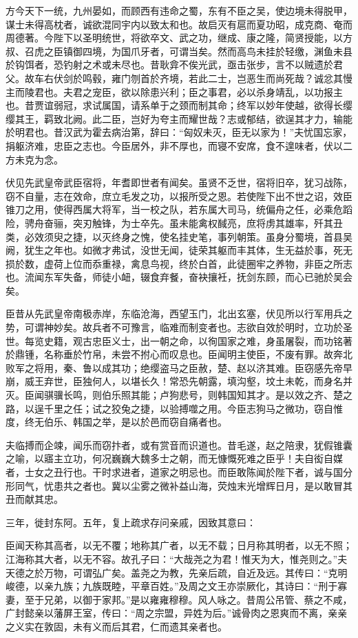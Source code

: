\documentclass[12pt,UTF8]{ctexbook}
\begin{document}
方今天下一统，九州晏如，而顾西有违命之蜀，东有不臣之吴，使边境未得脱甲，谋士未得高枕者，诚欲混同宇内以致太和也。故启灭有扈而夏功昭，成克商、奄而周德著。今陛下以圣明统世，将欲卒文、武之功，继成、康之隆，简贤授能，以方叔、召虎之臣镇御四境，为国爪牙者，可谓当矣。然而高鸟未挂於轻缴，渊鱼未县於钩饵者，恐钓射之术或未尽也。昔耿弇不俟光武，亟击张步，言不以贼遗於君父。故车右伏剑於鸣毂，雍门刎首於齐境，若此二士，岂恶生而尚死哉？诚忿其慢主而陵君也。夫君之宠臣，欲以除患兴利；臣之事君，必以杀身靖乱，以功报主也。昔贾谊弱冠，求试属国，请系单于之颈而制其命；终军以妙年使越，欲得长缨缨其王，羁致北阙。此二臣，岂好为夸主而耀世哉？志或郁结，欲逞其才力，输能於明君也。昔汉武为霍去病治第，辞曰：“匈奴未灭，臣无以家为！”夫忧国忘家，捐躯济难，忠臣之志也。今臣居外，非不厚也，而寝不安席，食不遑味者，伏以二方未克为念。

伏见先武皇帝武臣宿将，年耆即世者有闻矣。虽贤不乏世，宿将旧卒，犹习战陈，窃不自量，志在效命，庶立毛发之功，以报所受之恩。若使陛下出不世之诏，效臣锥刀之用，使得西属大将军，当一校之队，若东属大司马，统偏舟之任，必乘危蹈险，骋舟奋骊，突刃触锋，为士卒先。虽未能禽权馘亮，庶将虏其雄率，歼其丑类，必效须臾之捷，以灭终身之愧，使名挂史笔，事列朝策。虽身分蜀境，首县吴阙，犹生之年也。如微才弗试，没世无闻，徒荣其躯而丰其体，生无益於事，死无损於数，虚荷上位而忝重禄，禽息鸟视，终於白首，此徒圈牢之养物，非臣之所志也。流闻东军失备，师徒小衄，辍食弃餐，奋袂攘衽，抚剑东顾，而心已驰於吴会矣。

臣昔从先武皇帝南极赤岸，东临沧海，西望玉门，北出玄塞，伏见所以行军用兵之势，可谓神妙矣。故兵者不可豫言，临难而制变者也。志欲自效於明时，立功於圣世。每览史籍，观古忠臣义士，出一朝之命，以徇国家之难，身虽屠裂，而功铭著於鼎锺，名称垂於竹帛，未尝不拊心而叹息也。臣闻明主使臣，不废有罪。故奔北败军之将用，秦、鲁以成其功；绝缨盗马之臣赦，楚、赵以济其难。臣窃感先帝早崩，威王弃世，臣独何人，以堪长久！常恐先朝露，填沟壑，坟土未乾，而身名并灭。臣闻骐骥长鸣，则伯乐照其能；卢狗悲号，则韩国知其才。是以效之齐、楚之路，以逞千里之任；试之狡兔之捷，以验搏噬之用。今臣志狗马之微功，窃自惟度，终无伯乐、韩国之举，是以於邑而窃自痛者也。

夫临搏而企竦，闻乐而窃抃者，或有赏音而识道也。昔毛遂，赵之陪隶，犹假锥囊之喻，以寤主立功，何况巍巍大魏多士之朝，而无慷慨死难之臣乎！夫自衒自媒者，士女之丑行也。干时求进者，道家之明忌也。而臣敢陈闻於陛下者，诚与国分形同气，忧患共之者也。冀以尘雾之微补益山海，荧烛末光增辉日月，是以敢冒其丑而献其忠。

三年，徙封东阿。五年，复上疏求存问亲戚，因致其意曰：

臣闻天称其高者，以无不覆；地称其广者，以无不载；日月称其明者，以无不照；江海称其大者，以无不容。故孔子曰：“大哉尧之为君！惟天为大，惟尧则之。”夫天德之於万物，可谓弘广矣。盖尧之为教，先亲后疏，自近及远。其传曰：“克明峻德，以亲九族；九族既睦，平章百姓。”及周之文王亦崇厥化，其诗曰：“刑于寡妻，至于兄弟，以御于家邦。”是以雍雍穆穆。风人咏之。昔周公吊管、蔡之不咸，广封懿亲以藩屏王室，传曰：“周之宗盟，异姓为后。”诚骨肉之恩爽而不离，亲亲之义实在敦固，未有义而后其君，仁而遗其亲者也。
\end{document}
